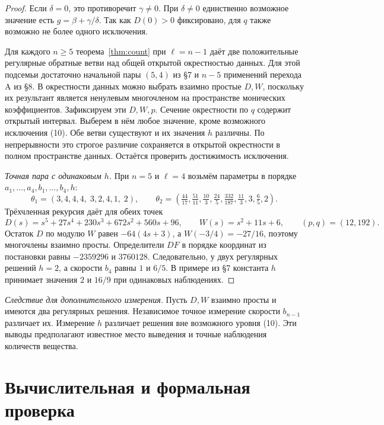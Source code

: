 \documentclass[11pt,a4paper]{article}
\begin{document}
\begin{proof}
Если \(\delta=0\), это противоречит \(\gamma\ne0\). При \(\delta\ne0\) единственно возможное значение есть \(g=\beta+\gamma/\delta\). Так как \(D(0)>0\) фиксировано, для \(q\) также возможно не более одного исключения.

Для каждого \(n\ge5\) теорема~\ref{thm:count} при \(\ell=n-1\) даёт две положительные регулярные обратные ветви над общей открытой окрестностью данных. Для этой подсемьи достаточно начальной пары \((5,4)\) из §7 и \(n-5\) применений перехода A из §8. В окрестности данных можно выбрать взаимно простые \(D,W\), поскольку их результант является ненулевым многочленом на пространстве монических коэффициентов. Зафиксируем эти \(D,W,p\). Сечение окрестности по \(q\) содержит открытый интервал. Выберем в нём любое значение, кроме возможного исключения (10). Обе ветви существуют и их значения \(h\) различны. По непрерывности это строгое различие сохраняется в открытой окрестности в полном пространстве данных. Остаётся проверить достижимость исключения.

\smallskip\noindent\textit{Точная пара с одинаковым \(h\).}
При \(n=5\) и \(\ell=4\) возьмём параметры в порядке \(a_1,\ldots,a_4,b_1,\ldots,b_4,h\):
\[
 \theta_1=(3,4,4,4,\;3,2,4,1,\;2),\qquad
 \theta_2=\left(\tfrac{44}{17},\tfrac{51}{11},\tfrac{10}{3},\tfrac{24}{5},
                 \tfrac{332}{187},\tfrac{11}{3},3,\tfrac65,2\right).
\]
Трёхчленная рекурсия даёт для обеих точек
\[
 D(s)=s^5+27s^4+230s^3+672s^2+560s+96,\qquad
 W(s)=s^2+11s+6,\qquad (p,q)=(12,192).
\]
Остаток \(D\) по модулю \(W\) равен \(-64(4s+3)\), а \(W(-3/4)=-27/16\), поэтому многочлены взаимно просты. Определители \(DF\) в порядке координат из постановки равны \(-2359296\) и \(3760128\). Следовательно, у двух регулярных решений \(h=2\), а скорости \(b_4\) равны \(1\) и \(6/5\). В примере из §7 константа \(h\) принимает значения \(2\) и \(16/9\) при одинаковых наблюдениях.
\end{proof}

\smallskip\noindent\textit{Следствие для дополнительного измерения.}
Пусть \(D,W\) взаимно просты и имеются два регулярных решения. Независимое точное измерение скорости \(b_{n-1}\) различает их. Измерение \(h\) различает решения вне возможного уровня (10). Эти выводы предполагают известное место выведения и точные наблюдения количеств вещества.

\section*{\color{ink} Вычислительная и формальная проверка}
\end{document}
